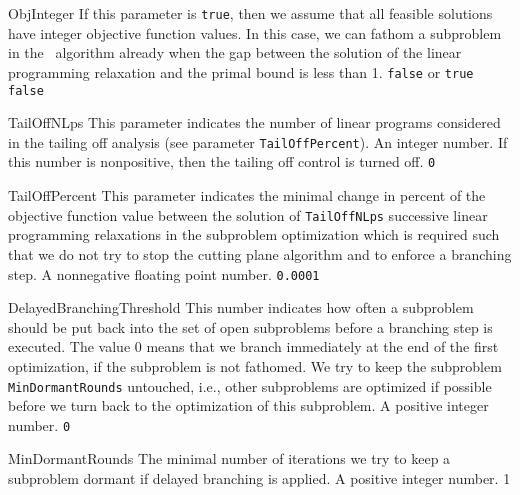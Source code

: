 \parameter
{ObjInteger}
{If this parameter is {\tt true}, then we assume that all feasible
 solutions have integer objective function
 values. In this case,
 we can fathom a subproblem in the \bab\ algorithm already
 when the gap between the solution of the linear programming
 relaxation and the primal bound is less than 1.}
{{\tt false} or {\tt true}}
{{\tt false}}

\parameter
{TailOffNLps}
{This parameter indicates the number of linear programs considered in the 
 tailing off analysis (see parameter {\tt TailOffPercent}).}
{An integer number. If this number is nonpositive, then the tailing off
 control is turned off.}
{{\tt 0}}

\parameter
{TailOffPercent}
{This parameter indicates the minimal change in percent of the objective 
 function value between
 the solution of {\tt TailOffNLps} successive linear programming relaxations
 in the subproblem optimization which is required such that
 we do not try to stop the cutting plane algorithm and to enforce a
 branching step.
}
{A nonnegative floating point number.}
{{\tt 0.0001}}

\parameter
{DelayedBranchingThreshold}
{This number
 indicates how often a subproblem should be put back
 into the set of open subproblems before a branching step is
 executed. The value 0 means that we branch immediately at the
 end of the first optimization, if the subproblem is not fathomed.
 We try to keep the subproblem {\tt MinDormantRounds} untouched, i.e.,
 other subproblems are optimized if possible before we turn back to the
 optimization of this subproblem.
}
{A positive integer number.}
{{\tt 0}}

\parameter
{MinDormantRounds}
{The minimal number 
 of iterations we try to keep a subproblem
  dormant if delayed branching is applied.}
{A positive integer number.}
{1}

